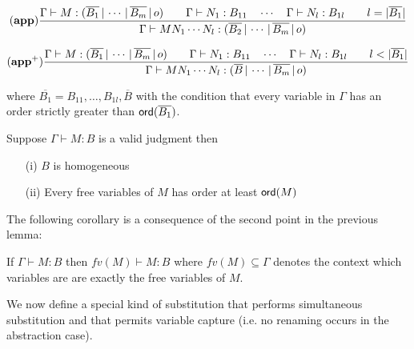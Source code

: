 \[ (\mathbf{app}) {{{{\Gamma} \vdash {M : (\overline{B_1} \, | \, \cdots \, | \, \overline{B_m} \, | \, o)}} \qquad
{{\Gamma} \vdash {N_1 : B_{11}}} \quad \cdots \quad {{\Gamma} \vdash {N_{l} :
B_{1l}}} \qquad l = |\overline{B_1}| } \over{ {{\Gamma} \vdash {M N_1
\cdots N_{l} : (\overline{B_2} \, | \, \cdots \, | \,
\overline{B_m} \, | \, o)}}}} \]


\[ (\mathbf{app^+}) {{{{\Gamma} \vdash {M : (\overline{B_1} \, | \, \cdots \, | \, \overline{B_m} \, | \, o)}} \qquad
{{\Gamma} \vdash {N_1 : B_{11}}} \quad \cdots \quad {{\Gamma} \vdash {N_{l} :
B_{1l}}} \qquad l < |\overline{B_1}| } \over{ {{\Gamma} \vdash {M N_1
\cdots N_{l} : (\overline{B} \, | \, \cdots \, | \,
\overline{B_m} \, | \, o)}}}} \]

where $\overline{B_1} = B_{11}, \ldots, B_{1l},\overline{B}$ with
the condition that every variable in $\Gamma$ has an order strictly greater
than ${\sf ord}(\overline{B_1})$.


\begin{lem}
\label{lem:safe_basic_prop} Suppose $\Gamma \vdash M : B$ is a
valid judgment then

\begin{itemize}
\item[(i)] $B$ is homogeneous
\item[(ii)] Every free variables of $M$ has order at least ${\sf ord}(M)$
\end{itemize}
\end{lem}

The following corollary is a consequence of the second point in the previous lemma:
\begin{property}
If $\Gamma \vdash M : B$ then $fv(M) \vdash M : B$ where $fv(M) \subseteq \Gamma$ denotes the context which variables are
are exactly the free variables of $M$.
\end{property}

We now define a special kind of substitution that performs simultaneous substitution and
that permits variable capture (i.e. no renaming occurs in the abstraction case).

